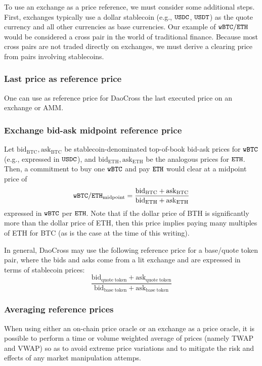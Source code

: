\documentclass[11pt, reqno]{amsart}
\theoremstyle{definition}
\theoremstyle{remark}
\newcommand{\bidbtc}{\mathrm{bid}_\mathrm{BTC}}
\newcommand{\askbtc}{\mathrm{ask}_\mathrm{BTC}}
\newcommand{\bideth}{\mathrm{bid}_\mathrm{ETH}}
\newcommand{\asketh}{\mathrm{ask}_\mathrm{ETH}}
\newcommand{\bidbase}{\mathrm{bid}_\mathrm{quote\;token}}
\newcommand{\askbase}{\mathrm{ask}_\mathrm{quote\;token}}
\newcommand{\bidquote}{\mathrm{bid}_\mathrm{base\;token}}
\newcommand{\askquote}{\mathrm{ask}_\mathrm{base\;token}}
\newcommand{\BTC}{\textnormal{\texttt{wBTC}}}
\newcommand{\ETH}{\textnormal{\texttt{ETH}}}
\newcommand{\USDC}{\textnormal{\texttt{USDC}}}
\newcommand{\USDT}{\textnormal{\texttt{USDT}}}
\newcommand{\midpoint}{\mathrm{midpoint}}
\begin{document}
To use an exchange as a price reference, we must consider some additional
steps. First, exchanges typically use a dollar stablecoin (e.g., $\USDC$,
$\USDT$) as the quote currency and all other currencies as base currencies. Our
example of $\BTC/\ETH$ would be considered a cross pair in the world of
traditional finance. Because most cross pairs are not traded directly on
exchanges, we must derive a clearing price from pairs involving stablecoins.

\subsubsection{Last price as reference price}
One can use as reference price for DaoCross the last executed price on an
exchange or AMM.

\subsubsection{Exchange bid-ask midpoint reference price}
Let $\bidbtc, \askbtc$ be stablecoin-denominated top-of-book bid-ask prices
for $\BTC$ (e.g., expressed in $\USDC$), and $\bideth, \asketh$ be the analogous
prices for $\ETH$. Then, a commitment to buy one $\BTC$ and pay $\ETH$ would
clear at a midpoint price of
\[
	\BTC/\ETH_{\midpoint} = \frac{\bidbtc + \askbtc}{\bideth + \asketh}
\]
expressed in $\BTC$ per $\ETH$. Note that if the dollar price of BTH is significantly
more than the dollar price of ETH, then this price implies paying many
multiples of ETH for BTC (as is the case at the time of this writing).

In general, DaoCross may use the following reference price for a base/quote
token pair, where the bids and asks come from a lit exchange and are expressed
in terms of stablecoin prices:
\begin{equation}
	\frac{\bidbase + \askbase}{\bidquote + \askquote}
\end{equation}

\subsubsection{Averaging reference prices}
When using either an on-chain price oracle or an exchange as a price oracle,
it is possible to perform a time or volume weighted average of prices (namely
TWAP and VWAP) so as to avoid extreme price variations and to mitigate the risk
and effects of any market manipulation attemps.

\end{document}
